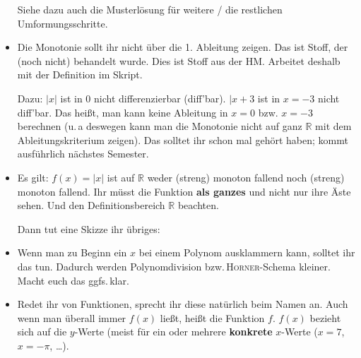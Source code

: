 \documentclass[11pt, a4paper]{article}
\newcommand{\R}{\mathbb{R}}
\newcommand{\RM}[1]{\MakeUppercase{\romannumeral #1{}}}
\begin{document}
\begin{itemize}
Siehe dazu auch die Musterlösung für weitere / die restlichen Umformungsschritte. 

\item Die Monotonie sollt ihr nicht über die 1. Ableitung zeigen. Das ist Stoff, der (noch nicht) behandelt wurde. Dies ist Stoff aus der  HM\RM{2}. Arbeitet deshalb mit der Definition im Skript. 

Dazu: $|x|$ ist in 0 nicht differenzierbar (diff'bar). $|x+3$ ist in $x = -3$ nicht diff'bar. Das heißt, man kann keine Ableitung in $x = 0$ bzw. $x = -3$ berechnen (u.\,a deswegen kann man die Monotonie nicht auf ganz $\R$ mit dem Ableitungskriterium zeigen). Das solltet ihr schon mal gehört haben; kommt ausführlich nächstes Semester.

\item Es gilt: $f(x) = |x|$ ist auf $\R$ weder (streng) monoton fallend noch (streng) monoton fallend. Ihr müsst die Funktion \textbf{als ganzes} und nicht nur ihre Äste sehen. Und den Definitionsbereich $\R$ beachten.

Dann tut eine Skizze ihr übriges:

\begin{figure}
\centering
{}
\end{figure}

\item Wenn man zu Beginn ein $x$ bei einem Polynom ausklammern kann, solltet ihr das tun. Dadurch werden Polynomdivision bzw.\,\textsc{Horner}-Schema kleiner. Macht euch das ggfs.\,klar.

\item Redet ihr von Funktionen, sprecht ihr diese natürlich beim Namen an. Auch wenn man überall immer $f(x)$ ließt, heißt die Funktion $f$. $f(x)$ bezieht sich auf die $y$-Werte (meist für ein oder mehrere \textbf{konkrete} $x$-Werte ($x = 7$, $x = -\pi$, \dots).


\end{itemize}
\end{document}
